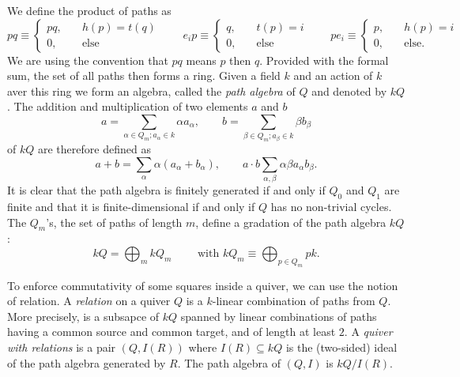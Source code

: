         We define the product of paths as
        \begin{equation}
            pq\equiv
            \begin{cases}
                pq,&\quad h(p)=t(q)\\
                0,&\quad\text{else}
            \end{cases}\qquad
            e_ip\equiv
            \begin{cases}
                q,&\quad t(p)=i\\
                0,&\quad\text{else}
            \end{cases}\qquad
            pe_i\equiv
            \begin{cases}
                p,&\quad h(p)=i\\
                0,&\quad\text{else}.
            \end{cases}
        \end{equation}
        We are using the convention that $pq$ means $p$ then $q$. Provided with the formal sum, the set of all paths then forms a ring. Given a field $k$ and an action of $k$ aver this ring we form an algebra, called the \emph{path algebra} of $Q$ and denoted by $kQ$. The addition and multiplication of two elements $a$ and $b$ 
        \begin{equation}
            a=\sum_{\alpha\in Q_m;a_\alpha\in k}\alpha a_\alpha,\qquad b=\sum_{\beta\in Q_m;a_\beta\in k}\beta b_\beta
        \end{equation}
        of $kQ$ are therefore defined as
        \begin{equation}
            a+b=\sum_{\alpha}\alpha(a_\alpha+b_\alpha),\qquad a\cdot b \sum_{\alpha,\beta}\alpha\beta a_\alpha b_\beta.
        \end{equation}
        It is clear that the path algebra is finitely generated if and only if $Q_0$ and $Q_1$ are finite and that it is finite-dimensional if and only if $Q$ has no non-trivial cycles. The $Q_m$'s, the set of paths of length $m$, define a gradation of the path algebra $kQ$:
        \begin{equation}
            kQ=\bigoplus_{m}kQ_m\qquad\text{ with } kQ_m\equiv\bigoplus_{p\in Q_m}pk.
        \end{equation}

        To enforce commutativity of some squares inside a quiver, we can use the notion of relation. A \emph{relation} on a quiver $Q$ is a $k$-linear combination of paths from $Q$. More precisely, is a subsapce of $kQ$ spanned by linear combinations of paths having a common source and common target, and of length at least $2$. A \emph{quiver with relations} is a pair $(Q,I(R))$ where $I(R)\subseteq kQ$ is the (two-sided) ideal of the path algebra generated by $R$. The path algebra of $(Q,I)$ is $kQ/I(R)$. 
        
